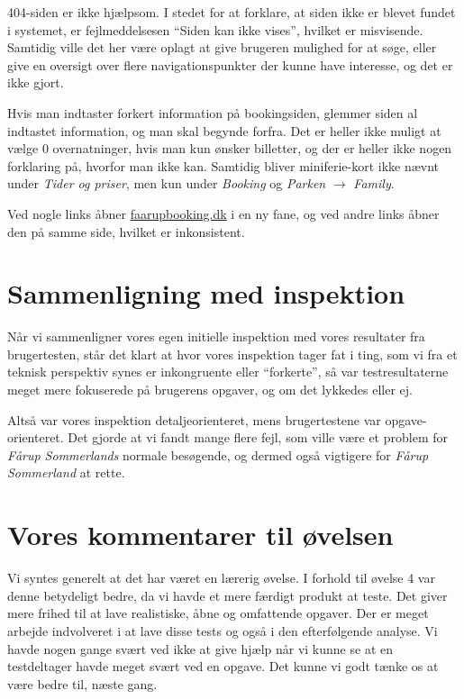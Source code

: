 \documentclass[10pt,a4paper]{article}      %
\begin{document}
404-siden er ikke hjælpsom. I stedet for at forklare, at siden ikke er
blevet fundet i systemet, er fejlmeddelsesen ``Siden kan ikke vises'', hvilket er
misvisende. Samtidig ville det her være oplagt at give brugeren mulighed for at
søge, eller give en oversigt over flere navigationspunkter der kunne have
interesse, og det er ikke gjort.

Hvis man indtaster forkert information på bookingsiden, glemmer siden al
indtastet information, og man skal begynde forfra. Det er heller ikke muligt at
vælge 0 overnatninger, hvis man kun ønsker billetter, og der er heller ikke
nogen forklaring på, hvorfor man ikke kan. Samtidig bliver miniferie-kort
ikke nævnt under \emph{Tider og priser}, men kun under \emph{Booking} og
\emph{Parken} $\rightarrow$ \emph{Family}.

Ved nogle links åbner \url{faarupbooking.dk} i en ny fane, og ved andre links
åbner den på samme side, hvilket er inkonsistent.

\section{Sammenligning med inspektion}
\label{apx:sammenligning-inspektion}

Når vi sammenligner vores egen initielle inspektion med vores resultater fra
brugertesten, står det klart at hvor vores inspektion tager fat i ting, som vi
fra et teknisk perspektiv synes er inkongruente eller ``forkerte'', så var
testresultaterne meget mere fokuserede på brugerens opgaver, og om det
lykkedes eller ej.

Altså var vores inspektion detaljeorienteret, mens brugertestene var
opgave-orienteret. Det gjorde at vi fandt mange flere fejl, som ville være et
problem for \emph{Fårup Sommerlands} normale besøgende, og dermed også
vigtigere for \emph{Fårup Sommerland} at rette.

\section{Vores kommentarer til øvelsen}
\label{apx:vores-kommentarer}

Vi syntes generelt at det har været en lærerig øvelse. I forhold til øvelse 4 var denne betydeligt bedre, da vi havde et mere færdigt produkt at teste. Det giver mere frihed til at lave realistiske, åbne og omfattende opgaver. Der er meget arbejde indvolveret i at lave disse tests og også i den efterfølgende analyse. Vi havde nogen gange svært ved ikke at give hjælp når vi kunne se at en testdeltager havde meget svært ved en opgave. Det kunne vi godt tænke os at være bedre til, næste gang. 
\end{document}
